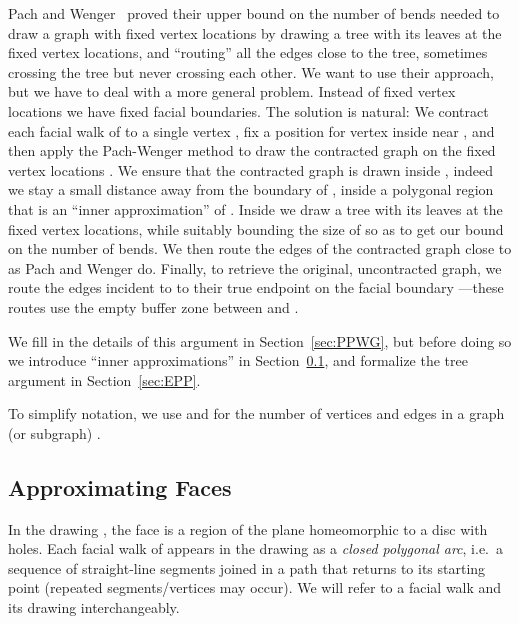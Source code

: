 \documentclass{llncs}
\begin{document}
Pach and Wenger~\cite{PW01} proved their upper bound on the number of bends needed to draw a graph with fixed vertex locations by drawing a tree with its leaves at the fixed vertex locations, and ``routing'' all the edges close to the tree, sometimes crossing the tree but never crossing each other. We want to use their approach, but we have to deal with a more general problem. Instead of fixed vertex locations we have fixed facial boundaries. The solution is natural: We contract each facial walk  of  to a single vertex , fix a position for vertex  inside  near , and then apply the Pach-Wenger method to draw the contracted graph on the fixed vertex locations . We ensure that the contracted graph is drawn inside , indeed we
stay a small distance away
from the boundary of , inside a polygonal region  that is an ``inner approximation'' of . Inside  we draw a tree  with its leaves  at the fixed vertex locations, while suitably bounding the size of  so as to get our bound on the number of bends. We then route the edges of the contracted graph close to  as  Pach and Wenger do. Finally, to retrieve the original, uncontracted graph,  we route the edges incident to  to their true endpoint on the facial boundary ---these routes use the empty buffer zone between  and .

We fill in the details of this argument in Section~\ref{sec:PPWG}, but before doing so we introduce ``inner approximations'' in Section~\ref{sec:AF},
and formalize the tree argument in Section~\ref{sec:EPP}.

To simplify notation, we use  and  for the number of vertices and edges in a graph (or subgraph) .

\subsection{Approximating Faces}\label{sec:AF}

In the drawing , the face  is a region of the plane
homeomorphic to a disc with holes.  Each facial walk of  appears in the drawing as a  {\em closed polygonal arc}, i.e.~a sequence of straight-line segments joined in a path that returns to its starting point (repeated segments/vertices may occur).
We will refer to a facial walk and its drawing interchangeably.
\end{document}
